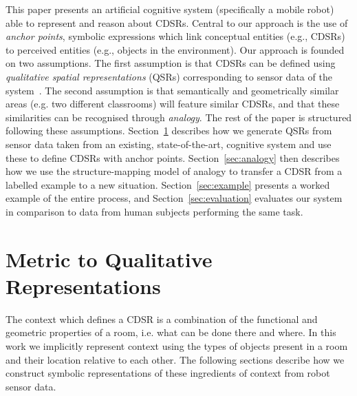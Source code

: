 \documentclass[letterpaper]{article}
\begin{document}
This paper presents an artificial cognitive system (specifically a mobile robot) able to represent and reason about CDSRs. Central to our approach is the use of \emph{anchor points}, symbolic expressions which link conceptual entities (e.g., CDSRs) to perceived entities (e.g., objects in the environment). Our approach is founded on two assumptions. The first assumption is that CDSRs can be defined using \emph{qualitative spatial representations} (QSRs) corresponding to sensor data of the system~\cite{Cohn:2001}. The second assumption is that semantically and geometrically similar areas (e.g. two different classrooms) will feature similar CDSRs, and that these similarities can be recognised through \emph{analogy}. The rest of the paper is structured following these assumptions. Section~\ref{sec:qsr-gen} describes how we generate QSRs from sensor data taken from an existing, state-of-the-art, cognitive system and use these to define CDSRs with anchor points. Section~\ref{sec:analogy} then describes how we use the structure-mapping model of analogy \cite{Gentner1983a} to transfer a CDSR from a labelled example to a new situation. Section~\ref{sec:example} presents a worked example of the entire process, and Section~\ref{sec:evaluation} evaluates our system in comparison to data from human subjects performing the same task.


\section{Metric to Qualitative Representations}\label{sec:qsr-gen}


The context which defines a CDSR is a combination of the functional and geometric properties of a room, i.e. what can be done there and where. In this work we implicitly represent context using the types of objects present in a room and their location relative to each other. The following sections describe how we construct symbolic representations of these ingredients of context from robot sensor data. 
\end{document}
